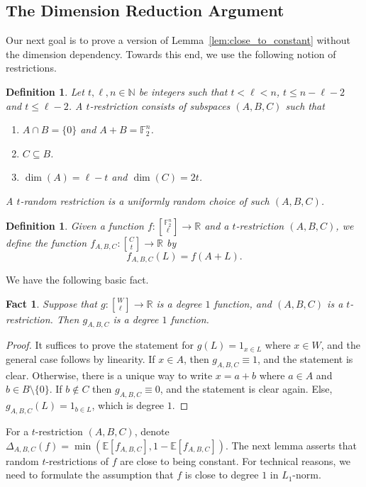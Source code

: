 \documentclass[11pt]{article}
\newtheorem{fact}[thm]{Fact}
\newtheorem{definition}[thm]{Definition}
\newcommand\E{\mathbb{E}}
\renewcommand\leq{\leqslant}
\providecommand{\sqbinom}[2]{\genfrac{[}{]}{0pt}{}{#1}{#2}}
\begin{document}
\subsection{The Dimension Reduction Argument}\label{sec:dim_reduction}
Our next goal is to prove a version of Lemma~\ref{lem:close_to_constant} without the dimension dependency. Towards this end, we use the following notion of restrictions.
\begin{definition}
    Let $t,\ell,n\in \mathbb{N}$ be integers such that $t<\ell<n$, $t\leq n-\ell-2$ and $t\leq \ell-2$. A $t$-restriction consists of subspaces $(A,B,C)$ such that 
    \begin{enumerate}
        \item $A\cap B=\{0\}$ and $A+B=\mathbb{F}_2^n$.
        \item $C\subseteq B$.
        \item $\dim(A)=\ell-t$ and $\dim(C)=2t$.
    \end{enumerate}
    A $t$-random restriction is a uniformly random choice of such $(A,B,C)$.
\end{definition}
\begin{definition}
    Given a function $f\colon {\sqbinom{\mathbb{F}_2^n}{\ell}}\to\mathbb{R}$ and a $t$-restriction $(A,B,C)$, we define the function $f_{A,B,C}\colon \sqbinom{C}{t}\to\mathbb{R}$ by
    \[
    f_{A,B,C}(L) = f(A + L).
    \]
\end{definition}
We have the following basic fact.
\begin{fact}\label{fact:rest_deg_1}
    Suppose that $g\colon {\sqbinom{W}{\ell}}\to\mathbb{R}$ is a degree $1$ function, and $(A,B,C)$ is a $t$-restriction. Then $g_{A,B,C}$ is a degree $1$ function.
\end{fact}
\begin{proof}
    It suffices to prove the statement for $g(L)=1_{x\in L}$ where $x\in W$, and the general case follows by linearity. If $x\in A$, then $g_{A,B,C}\equiv 1$, and the statement is clear. Otherwise, there is a unique way to write $x=a+b$ where $a\in A$ and $b\in B\setminus \{0\}$. If $b\not \in C$ then $g_{A,B,C}\equiv 0$, and the statement is clear again. Else, 
    $g_{A,B,C}(L) = 1_{b\in L}$, which is degree $1$.
\end{proof}
For a $t$-restriction $(A,B,C)$, denote $\Delta_{A,B,C}(f) = \min(\E[f_{A,B,C}], 1-\E[f_{A,B,C}])$. The next lemma asserts that random $t$-restrictions of $f$ are close to being constant. For technical reasons, we need to formulate the assumption that $f$ is close to degree $1$ in $L_1$-norm.
\end{document}
